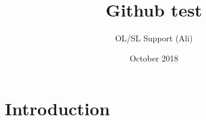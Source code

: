 \documentclass{article}
\title{Github test}
\author{OL/SL Support (Ali) }
\date{October 2018}
\begin{document}
\maketitle

\section{Introduction}
\end{document}
